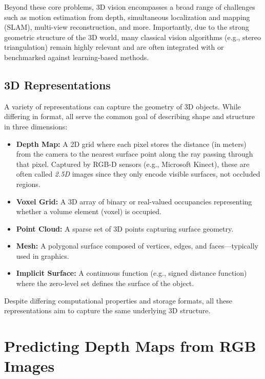 Beyond these core problems, 3D vision encompasses a broad range of challenges such as motion estimation from depth, simultaneous localization and mapping (SLAM), multi-view reconstruction, and more. Importantly, due to the strong geometric structure of the 3D world, many classical vision algorithms (e.g., stereo triangulation) remain highly relevant and are often integrated with or benchmarked against learning-based methods.

\subsection{3D Representations}
\label{subsec:chapter23_3d_representations}

A variety of representations can capture the geometry of 3D objects. While differing in format, all serve the common goal of describing shape and structure in three dimensions:

\begin{itemize}
    \item \textbf{Depth Map:} A 2D grid where each pixel stores the distance (in meters) from the camera to the nearest surface point along the ray passing through that pixel. Captured by RGB-D sensors (e.g., Microsoft Kinect), these are often called \emph{2.5D} images since they only encode visible surfaces, not occluded regions.
    \item \textbf{Voxel Grid:} A 3D array of binary or real-valued occupancies representing whether a volume element (voxel) is occupied.
    \item \textbf{Point Cloud:} A sparse set of 3D points capturing surface geometry.
    \item \textbf{Mesh:} A polygonal surface composed of vertices, edges, and faces—typically used in graphics.
    \item \textbf{Implicit Surface:} A continuous function (e.g., signed distance function) where the zero-level set defines the surface of the object.
\end{itemize}

Despite differing computational properties and storage formats, all these representations aim to capture the same underlying 3D structure.

\section{Predicting Depth Maps from RGB Images}
\label{sec:chapter23_depth_prediction}


